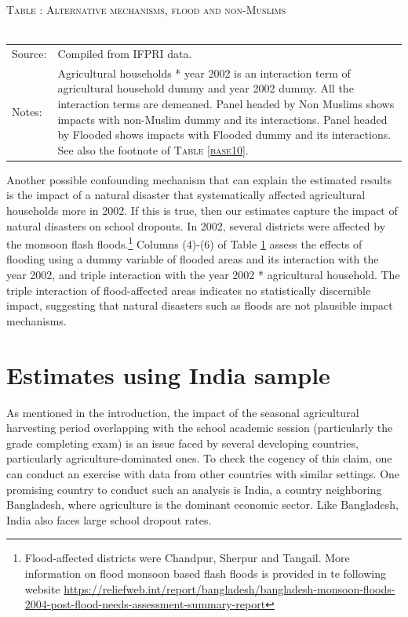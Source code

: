 \documentclass[12pt,letterpaper]{article}\usepackage[margin=1in]{geometry}
\newcommand{\0}{\ensuremath{\mbox{\boldmath $0$}}}
\begin{document}
\begin{table}\hfil\textsc{\footnotesize Table \thetable: Alternative mechanisms, flood and non-Muslims\label{FloodNonMuslimResultsConcise}}\\\setlength{\tabcolsep}{.5pt}\renewcommand{\arraystretch}{.675}\hspace{-2em}\hfil\\
\renewcommand{\arraystretch}{1}
\hfil\begin{tabular}{>{\hfill\scriptsize}p{1cm}<{}>{\scriptsize}p{12cm}<{\hfill}} 
Source:& Compiled from IFPRI data. \\[-1ex] 
Notes:&  \textsf{Agricultural households * year 2002} is an interaction term of agricultural household dummy and year 2002 dummy. All the interaction terms are demeaned. Panel headed by Non Muslims shows impacts with non-Muslim dummy and its interactions. Panel headed by Flooded shows impacts with Flooded dummy and its interactions. See also the footnote of \textsc{\footnotesize Table \ref{base10}}. 
\end{tabular} \end{table}


Another possible confounding mechanism that can explain the estimated results is the impact of a natural disaster that systematically affected agricultural households more in 2002. If this is true, then our estimates capture the impact of natural disasters on school dropouts. In 2002, several districts were affected by the monsoon flash floods.\footnote{Flood-affected districts were Chandpur, Sherpur and Tangail. More information on flood monsoon based flash floods is provided in te following website \url{https://reliefweb.int/report/bangladesh/bangladesh-monsoon-floods-2004-post-flood-needs-assessment-summary-report} } Columns (4)-(6) of Table \ref{FloodNonMuslimResultsConcise} assess the effects of flooding using a dummy variable of flooded areas and its interaction with the year 2002, and triple interaction with the year 2002 * agricultural household. The triple interaction of flood-affected areas indicates no statistically discernible impact, suggesting that natural disasters such as floods are not plausible impact mechanisms.


\section{Estimates using India sample}

As mentioned in the introduction, the impact of the seasonal agricultural harvesting period overlapping with the school academic session (particularly the grade completing exam) is an issue faced by several developing countries, particularly agriculture-dominated ones. To check the cogency of this claim, one can conduct an exercise with data from other countries with similar settings. One promising country to conduct such an analysis is India, a country neighboring Bangladesh, where agriculture is the dominant economic sector. Like Bangladesh, India also faces large school dropout rates.
\end{document}

